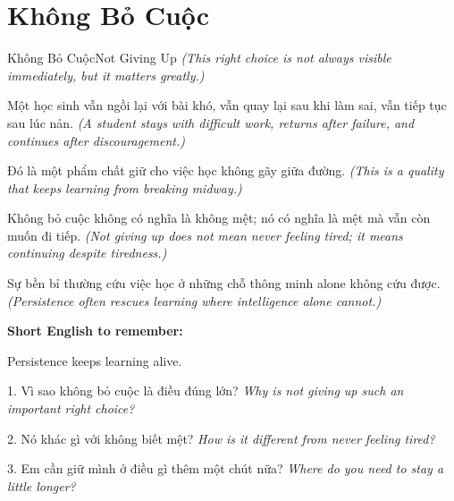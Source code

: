 \section{Không Bỏ Cuộc}
\begin{truyen}{Không Bỏ Cuộc}{Not Giving Up}
\textit{(This right choice is not always visible immediately, but it matters greatly.)}

Một học sinh vẫn ngồi lại với bài khó, vẫn quay lại sau khi làm sai, vẫn tiếp tục sau lúc nản.
\textit{(A student stays with difficult work, returns after failure, and continues after discouragement.)}

Đó là một phẩm chất giữ cho việc học không gãy giữa đường.
\textit{(This is a quality that keeps learning from breaking midway.)}

Không bỏ cuộc không có nghĩa là không mệt; nó có nghĩa là mệt mà vẫn còn muốn đi tiếp.
\textit{(Not giving up does not mean never feeling tired; it means continuing despite tiredness.)}
\end{truyen}

\begin{baihoc}
Sự bền bỉ thường cứu việc học ở những chỗ thông minh alone không cứu được.
\textit{(Persistence often rescues learning where intelligence alone cannot.)}
\end{baihoc}

\begin{ghinhoanh}
\textbf{Short English to remember:}

Persistence keeps learning alive.

\end{ghinhoanh}

\begin{tuhocnhanh}
1. Vì sao không bỏ cuộc là điều đúng lớn? \textit{Why is not giving up such an important right choice?}

2. Nó khác gì với không biết mệt? \textit{How is it different from never feeling tired?}

3. Em cần giữ mình ở điều gì thêm một chút nữa? \textit{Where do you need to stay a little longer?}
\end{tuhocnhanh}
\ngancach

